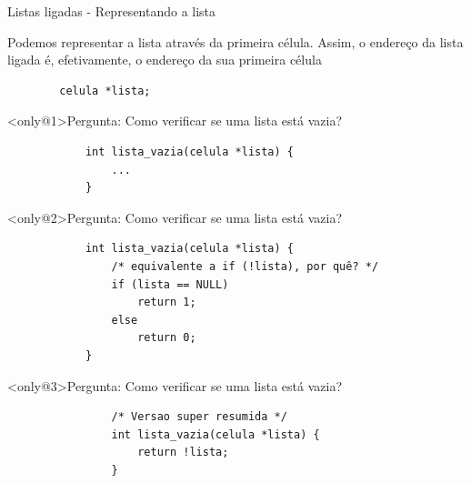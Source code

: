 \documentclass{beamer}
\begin{document}
\begin{frame}[fragile]{Listas ligadas - Representando a lista}

    Podemos representar a lista através da primeira célula.
    Assim, o endereço da lista ligada é, efetivamente, o endereço da sua primeira célula

    \begin{verbatim}
        celula *lista;
    \end{verbatim}

    \centering

    \begin{block}<only@1>{Pergunta: Como verificar se uma lista está vazia?}
        \begin{verbatim}
            int lista_vazia(celula *lista) {
                ...
            }
        \end{verbatim}
    \end{block}

    \begin{block}<only@2>{Pergunta: Como verificar se uma lista está vazia?}
        \begin{verbatim}
            int lista_vazia(celula *lista) {
                /* equivalente a if (!lista), por quê? */
                if (lista == NULL)
                    return 1;
                else
                    return 0;
            }
        \end{verbatim}
    \end{block}

    \begin{block}<only@3>{Pergunta: Como verificar se uma lista está vazia?}
        \begin{verbatim}
                /* Versao super resumida */
                int lista_vazia(celula *lista) {
                    return !lista;
                }
        \end{verbatim}
    \end{block}

\end{frame}
\end{document}
